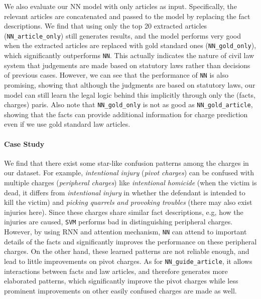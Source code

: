 We also evaluate our NN model with only articles as input. Specifically, the relevant articles are concatenated and passed to the model by replacing the fact descriptions. We find that using only the top 20 extracted articles (\texttt{NN\_article\_only}) still generates  results, and the model performs very good when the extracted articles are replaced with gold standard ones (\texttt{NN\_gold\_only}), which significantly outperforms \texttt{NN}. 
This actually indicates the nature of civil law system that judgements are made based on statutory laws rather than decisions of previous cases.
However, we can see that the performance of \texttt{NN} is also promising, showing that although the judgments are based on statutory laws, our model can still learn the legal logic behind this implicitly through only the (facts, charges) paris. 
Also note that \texttt{NN\_gold\_only} is not as good as \texttt{NN\_gold\_article}, showing that the facts can provide additional information for charge prediction even if we use gold standard law articles.


\paragraph{Case Study}
We find that there exist some star-like confusion patterns among the charges in our dataset. For example, \emph{intentional injury} (\emph{pivot charges}) can be confused with multiple charges (\emph{peripheral charges}) like \emph{intentional homicide} (when the victim is dead, it differs from \emph{intentional injury} in whether the defendant is intended to kill the victim) and \emph{picking quarrels and provoking troubles} (there may also exist injuries here). 
Since these charges share similar fact descriptions, e.g, how the injuries are caused, \texttt{SVM} performs bad in distinguishing peripheral charges.  
However, by using RNN and attention mechanism, \texttt{NN} can attend to important details of the facts and significantly improves the performance on these peripheral charges. 
On the other hand, these learned patterns are not reliable enough, and lead to little improvements on pivot charges.
As for \texttt{NN\_guide\_article}, it allows interactions between facts and law articles, and therefore generates more elaborated patterns, which significantly improve the pivot charges while less prominent improvements on other easily confused charges are made as well.

